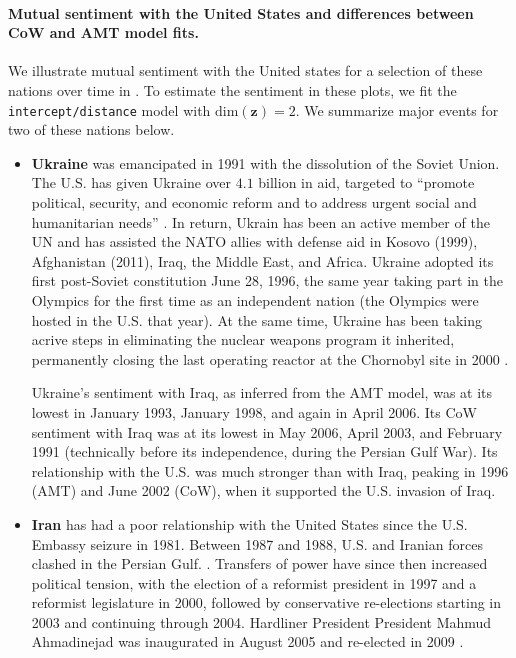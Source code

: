 \paragraph{Mutual sentiment with the United States and differences
 between CoW and AMT model fits.}
We illustrate mutual sentiment with the United states for a selection
of these nations over time in .
To estimate the sentiment in these plots, we fit the
\verb!intercept/distance! model with $\mbox{dim}(\bm z) = 2$.
We summarize major events for two of these nations below.
\begin{itemize}
  \item \textbf{Ukraine} was emancipated in 1991 with the dissolution
    of the Soviet Union.  The U.S. has given Ukraine over $4.1$
    billion in aid, targeted to ``promote political, security, and
    economic reform and to address urgent social and humanitarian
    needs'' \citep{ukrainestate:2012}.  In return, Ukrain has been an
    active member of the UN and has assisted the NATO allies with
    defense aid in Kosovo (1999), Afghanistan (2011), Iraq, the Middle
    East, and Africa.  Ukraine adopted its first post-Soviet
    constitution June 28, 1996, the same year taking part in the
    Olympics for the first time as an independent nation (the Olympics
    were hosted in the U.S. that year).  At the same time, Ukraine has
    been taking acrive steps in eliminating the nuclear weapons
    program it inherited, permanently closing the last operating
    reactor at the Chornobyl site in 2000 \citep{ukrainestate:2012}.

    Ukraine's sentiment with Iraq, as inferred from the AMT model, was
    at its lowest in January 1993, January 1998, and again in April
    2006.  Its CoW sentiment with Iraq was at its lowest in May 2006,
    April 2003, and February 1991 (technically before its
    independence, during the Persian Gulf War). Its relationship with
    the U.S. was much stronger than with Iraq, peaking in 1996 (AMT)
    and June 2002 (CoW), when it supported the U.S. invasion of Iraq.

  \item \textbf{Iran} has had a poor relationship with the United
    States since the U.S. Embassy seizure in 1981.  Between 1987 and
    1988, U.S. and Iranian forces clashed in the Persian Gulf.
    \citep{irancia:2012}.  Transfers of power have since then increased
    political tension, with the election of a reformist president in
    1997 and a reformist legislature in 2000, followed by conservative
    re-elections starting in 2003 and continuing through 2004.
    Hardliner President President Mahmud Ahmadinejad was inaugurated
    in August 2005 and re-elected in 2009 \citep{irancia:2012}.


\end{itemize}

